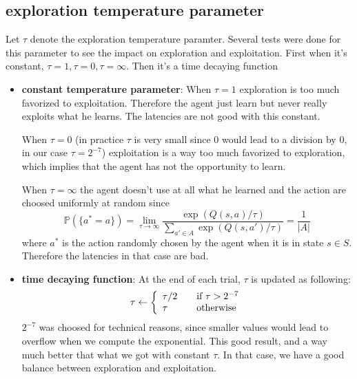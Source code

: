 \documentclass[12pt,a4paper]{article}
\begin{document}
\subsection*{exploration temperature parameter}
Let $\tau$ denote the exploration temperature paramter. 
Several tests were done for this parameter to see the impact on exploration and exploitation. First when it's constant, $\tau=1, \tau=0, \tau=\infty$. Then it's a time decaying function
\begin{itemize}
    \item \textbf{constant temperature parameter}: When $\tau=1$ exploration is too much favorized to exploitation. Therefore the agent just learn but never really exploits what he learns.
    The latencies are not good with this constant. 
    
    When $\tau=0$ (in practice $\tau$ is very small since 0 would lead to a division by 0, in our case $\tau=2^{-7}$) 
    exploitation is a way too much favorized to exploration, which implies that the agent has not the opportunity to learn. 
    
    When $\tau=\infty$ the agent doesn't use at all what he learned
    and the action are choosed uniformly at random since \[
    \mathbb{P}(\{a^*=a\}) = \lim_{\tau\rightarrow\infty}{\frac{\exp(Q(s,a)/\tau)}{\sum_{a'\in A}{\exp(Q(s,a')/\tau)}}} = \frac{1}{|A|}
    \]
    where $a^*$ is the action randomly chosen by the agent when it is in state $s\in S$. Therefore the latencies in that case are bad.

    \item \textbf{time decaying function}: At the end of each trial, $\tau$ is updated as following:
    \[
    \tau \leftarrow \left\{
        \begin{array}{l l}
            \tau/2 & \quad \text{if $\tau > 2^{-7}$}\\
            \tau & \quad \text{otherwise}\\
        \end{array} \right.
    \]
    $2^{-7}$ was choosed for technical reasons, since smaller values would lead to overflow when we compute the exponential. This good result, and a way much better that what we got with
    constant $\tau$. In that case, we have a good balance between exploration and exploitation.

\end{itemize}
\end{document}
